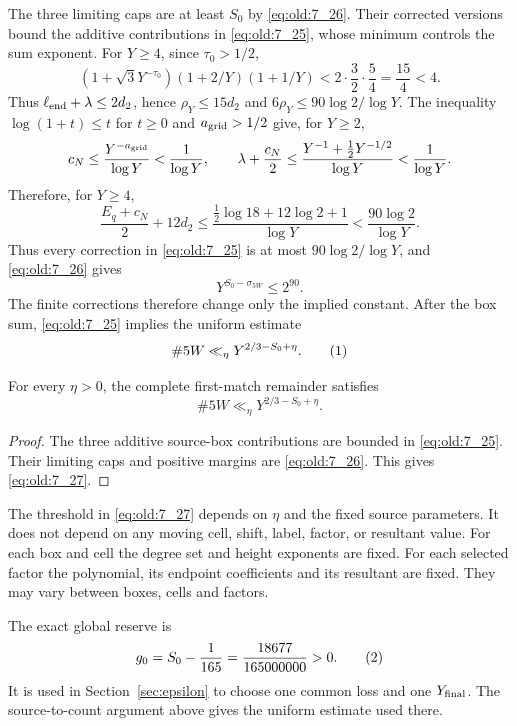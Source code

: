 The three limiting caps are at least \(S_0\) by \eqref{eq:old:7_26}. Their corrected
versions bound the additive contributions in \eqref{eq:old:7_25}, whose minimum controls
the sum exponent. For \(Y\ge4\), since \(\tau_0>1/2\),
\[
 (1+\sqrt3Y^{-\tau_0})(1+2/Y)(1+1/Y)
 <2\cdot\frac32\cdot\frac54=\frac{15}{4}<4.
\]
Thus \(\ell_{\rm end}+\lambda\le2d_2\), hence
\(\rho_Y\le15d_2\) and \(6\rho_Y\le90\log2/\log Y\).
The inequality \(\log(1+t)\le t\) for \(t\ge0\) and
\(a_{\rm grid}>1/2\) give, for \(Y\ge2\),
\[
 c_N\le\frac{Y^{-a_{\rm grid}}}{\log Y}<\frac1{\log Y},
 \qquad
 \lambda+\frac{c_N}{2}
 \le\frac{Y^{-1}+\tfrac12Y^{-1/2}}{\log Y}
 <\frac1{\log Y}.
\]
Therefore, for \(Y\ge4\),
\[
 \frac{E_q+c_N}{2}+12d_2
 \le\frac{\tfrac12\log18+12\log2+1}{\log Y}
 <\frac{90\log2}{\log Y}.
\]
Thus every correction in \eqref{eq:old:7_25} is at most
\(90\log2/\log Y\), and \eqref{eq:old:7_26} gives
\[
 Y^{S_0-\sigma_{5W}}\le2^{90}.
\]
The finite corrections therefore change only the implied constant.
After the box sum, \eqref{eq:old:7_25} implies the uniform estimate
\[
 \#5W\ll_\eta Y^{2/3-S_0+\eta}.
\AutoTag{eq:old:7_27}
\]
\begin{rowproposition}\label{prop:row-5w}
For every \(\eta>0\), the complete first-match remainder satisfies
\[
 \#5W\ll_\eta Y^{2/3-S_0+\eta}.
\]
\end{rowproposition}
\begin{proof}
The three additive source-box contributions are bounded in
\eqref{eq:old:7_25}. Their limiting caps and positive margins are
\eqref{eq:old:7_26}. This gives \eqref{eq:old:7_27}.
\end{proof}
The threshold in \eqref{eq:old:7_27} depends on \(\eta\) and the fixed
source parameters. It does not depend on any moving cell, shift, label,
factor, or resultant value. For each box and cell the degree set and
height exponents are fixed. For each selected factor the polynomial, its
endpoint coefficients and its resultant are fixed. They may vary between
boxes, cells and factors.

The exact global reserve is
\[
 g_0=S_0-\frac1{165}=\frac{18677}{165000000}>0.
\AutoTag{eq:old:7_28}
\]
It is used in Section~\ref{sec:epsilon} to choose one common loss and
one \(Y_{\rm final}\). The source-to-count argument above gives the
uniform estimate used there.
